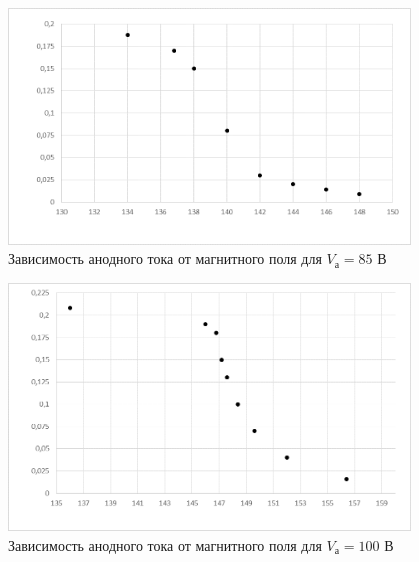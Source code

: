 \documentclass[a4paper, 12pt]{article}
\begin{document}
\begin {figure}[H]
\begin{center}
\includegraphics[width=0.95\textwidth]{graph4_gk}
\caption{Зависимость анодного тока от магнитного поля для $V_\text{а}=85$ В}
\end{center}
\end {figure}



\begin {figure}[H]
\begin{center}
\includegraphics[width=0.95\textwidth]{graph5_gk}
\caption{Зависимость анодного тока от магнитного поля для $V_\text{а}=100$ В}
\end{center}
\end {figure}
\end{document}
